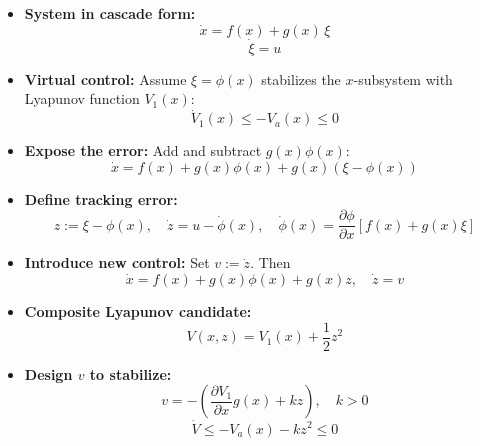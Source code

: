 \begin{itemize}
    \item \textbf{System in cascade form:}
    \begin{equation}
        \dot{x} = f(x) + g(x)\, \xi  
    \end{equation}
    \begin{equation}
        \dot{\xi} = u
    \end{equation}

    \item \textbf{Virtual control:} Assume $\xi = \phi(x)$ stabilizes the $x$-subsystem with Lyapunov function $V_1(x)$:
    \begin{equation}
        \dot{V}_1(x) \le -V_a(x) \le 0
    \end{equation}

    \item \textbf{Expose the error:} Add and subtract $g(x)\phi(x)$:
    \begin{equation}
        \dot{x} = f(x) + g(x)\phi(x) + g(x)(\xi - \phi(x))
    \end{equation}

    \item \textbf{Define tracking error:}
    \begin{equation}
        z := \xi - \phi(x), \quad \dot{z} = u - \dot{\phi}(x), \quad 
        \dot{\phi}(x) = \frac{\partial \phi}{\partial x}[f(x) + g(x)\xi]
    \end{equation}

    \item \textbf{Introduce new control:} Set $v := \dot{z}$. Then
    \begin{equation}
        \dot{x} = f(x) + g(x)\phi(x) + g(x) z, \quad \dot{z} = v
    \end{equation}

    \item \textbf{Composite Lyapunov candidate:}
    \begin{equation}
        V(x,z) = V_1(x) + \frac{1}{2} z^2
    \end{equation}

    \item \textbf{Design $v$ to stabilize:}
    \begin{equation}
        v = - \left( \frac{\partial V_1}{\partial x} g(x) + k z \right), \quad k>0
    \end{equation}
    \begin{equation}
        \dot{V} \le - V_a(x) - k z^2 \le 0
    \end{equation}


\end{itemize}
